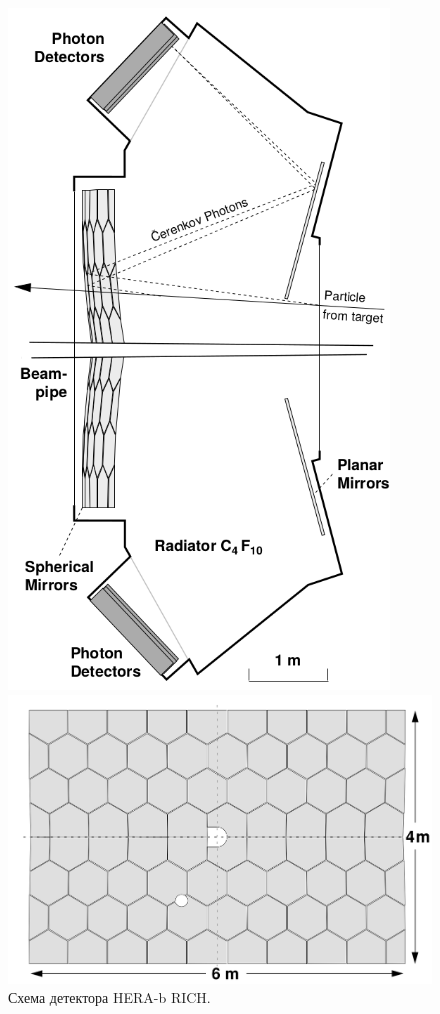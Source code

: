\begin{figure}[H]
\begin{minipage}[b]{0.45\textwidth}
\includegraphics[width=0.9\textwidth]{pictures/HERAb_RICH.png}
\caption{Схема детектора HERA-b RICH.}
\label{fig:HERAbRICH}
\end{minipage}
\hspace{0.01\textwidth}
\begin{minipage}[b]{0.545\textwidth}
\includegraphics[width=1.0\textwidth]{pictures/HERAb_RICH_mirrors.png}

\end{minipage}
\end{figure}
